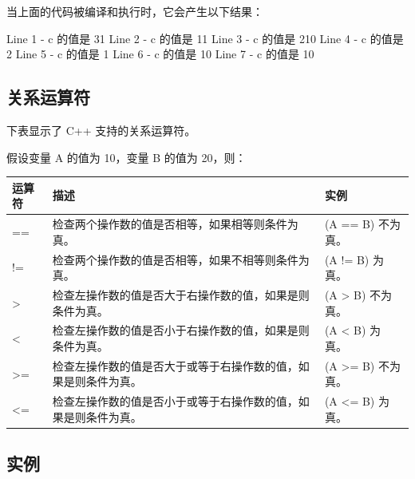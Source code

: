 \documentclass[
]{article}
\newenvironment{Shaded}{}{}
\newcommand{\DecValTok}[1]{\textcolor[rgb]{0.25,0.63,0.44}{#1}}
\newcommand{\NormalTok}[1]{#1}
\newcommand{\OperatorTok}[1]{\textcolor[rgb]{0.40,0.40,0.40}{#1}}
\begin{document}
当上面的代码被编译和执行时，它会产生以下结果：

\begin{Shaded}
\begin{Highlighting}[]
\NormalTok{Line }\DecValTok{1} \OperatorTok{{-}}\NormalTok{ c 的值是 }\DecValTok{31}
\NormalTok{Line }\DecValTok{2} \OperatorTok{{-}}\NormalTok{ c 的值是 }\DecValTok{11}
\NormalTok{Line }\DecValTok{3} \OperatorTok{{-}}\NormalTok{ c 的值是 }\DecValTok{210}
\NormalTok{Line }\DecValTok{4} \OperatorTok{{-}}\NormalTok{ c 的值是 }\DecValTok{2}
\NormalTok{Line }\DecValTok{5} \OperatorTok{{-}}\NormalTok{ c 的值是 }\DecValTok{1}
\NormalTok{Line }\DecValTok{6} \OperatorTok{{-}}\NormalTok{ c 的值是 }\DecValTok{10}
\NormalTok{Line }\DecValTok{7} \OperatorTok{{-}}\NormalTok{ c 的值是 }\DecValTok{10}
\end{Highlighting}
\end{Shaded}

\hypertarget{ux5173ux7cfbux8fd0ux7b97ux7b26}{%
\subsection{关系运算符}\label{ux5173ux7cfbux8fd0ux7b97ux7b26}}

下表显示了 C++ 支持的关系运算符。

假设变量 A 的值为 10，变量 B 的值为 20，则：

\begin{longtable}[]{@{}lll@{}}
\toprule
运算符 & 描述 & 实例 \\
\midrule
\endhead
== & 检查两个操作数的值是否相等，如果相等则条件为真。 & (A == B)
不为真。 \\
!= & 检查两个操作数的值是否相等，如果不相等则条件为真。 & (A != B)
为真。 \\
\textgreater{} &
检查左操作数的值是否大于右操作数的值，如果是则条件为真。 & (A
\textgreater{} B) 不为真。 \\
\textless{} & 检查左操作数的值是否小于右操作数的值，如果是则条件为真。 &
(A \textless{} B) 为真。 \\
\textgreater= &
检查左操作数的值是否大于或等于右操作数的值，如果是则条件为真。 & (A
\textgreater= B) 不为真。 \\
\textless= &
检查左操作数的值是否小于或等于右操作数的值，如果是则条件为真。 & (A
\textless= B) 为真。 \\
\bottomrule
\end{longtable}

\hypertarget{ux5b9eux4f8b-6}{%
\subsection{实例}\label{ux5b9eux4f8b-6}}
\end{document}
